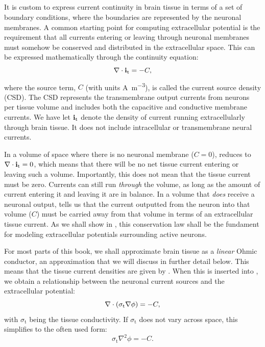 \subsection{}
\label{sec:Basics:C} 
It is custom to express current continuity in brain tissue in terms of a set of boundary conditions, where the boundaries are represented by the neuronal membranes. A common starting point for computing extracellular potential is the requirement that 
all currents entering or leaving through neuronal membranes must somehow be conserved and distributed in the extracellular space. This can be expressed mathematically through the continuity equation:
\begin{equation}
{\bf \nabla} \cdot {\bf i}_\text{t} = -C, 
\label{eq:Basics:continuity1}
\end{equation}
where the source term, $C$ (with units \si{\ampere\per\cubic\metre}), is called the current source density (CSD). The CSD represents the transmembrane output currents from neurons per tissue volume and includes both the capacitive and conductive membrane currents. We have let ${\bf i}_\text{t}$ denote the density of current running extracellularly through brain tissue. It does not include intracellular or transmembrane neural currents. 

In a volume of space where there is no neuronal membrane ($C = 0$),  reduces to ${\bf \nabla} \cdot {\bf i}_\text{t} = 0$, which means that there will be no net tissue current entering or leaving such a volume. Importantly, this does not mean that the tissue current must be zero. Currents can still run \textit{through} the volume, as long as the amount of current entering it and leaving it are in balance. In a volume that \textit{does} receive a neuronal output,  tells us that the current outputted from the neuron into that volume ($C$) must be carried away from that volume in terms of an extracellular tissue current. As we shall show in , this conservation law shall be the fundament for modeling extracellular potentials surrounding active neurons.

For most parts of this book, we shall approximate brain tissue as a \textit{linear} Ohmic conductor, an approximation that we will discuss in further detail below. This means that the tissue current densities are given by . When this is inserted into , we obtain a relationship between the neuronal current sources and the extracellular potential: 
\begin{equation}
{\bf \nabla} \cdot \left(\sigma_\text{t} {\bf \nabla} {\phi} \right) = -C, 
\label{eq:Basics:continuity2}
\end{equation}
with $\sigma_\text{t}$ being the tissue conductivity. If $\sigma_\text{t}$ does not vary across space, this simplifies to the often used form:
\begin{equation}
\sigma_\text{t} \nabla^2{\phi} = -C.
\label{eq:Basics:continuity3}
\end{equation}


